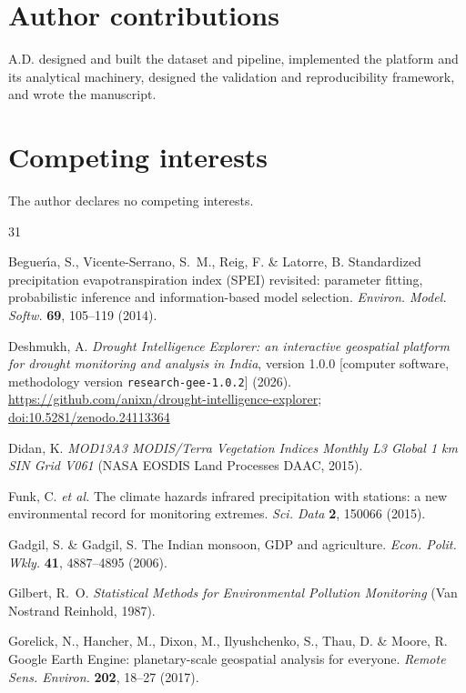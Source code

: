 \documentclass[10pt,a4paper]{article}
\begin{document}
\section*{Author contributions}
A.D. designed and built the dataset and pipeline, implemented the platform and its analytical machinery, designed the validation and reproducibility framework, and wrote the manuscript.

\section*{Competing interests}
The author declares no competing interests.

\begin{thebibliography}{31}
\footnotesize

 Beguer\'{\i}a, S., Vicente-Serrano, S.~M., Reig, F. \& Latorre, B. Standardized precipitation evapotranspiration index (SPEI) revisited: parameter fitting, probabilistic inference and information-based model selection. \textit{Environ. Model. Softw.} \textbf{69}, 105--119 (2014).

 Deshmukh, A. \textit{Drought Intelligence Explorer: an interactive geospatial platform for drought monitoring and analysis in India}, version 1.0.0 [computer software, methodology version \texttt{research-gee-1.0.2}] (2026). \url{https://github.com/anixn/drought-intelligence-explorer}; \href{https://doi.org/10.5281/zenodo.24113364}{doi:10.5281/zenodo.24113364}

 Didan, K. \textit{MOD13A3 MODIS/Terra Vegetation Indices Monthly L3 Global 1 km SIN Grid V061} (NASA EOSDIS Land Processes DAAC, 2015).

 Funk, C. \textit{et al.} The climate hazards infrared precipitation with stations: a new environmental record for monitoring extremes. \textit{Sci. Data} \textbf{2}, 150066 (2015).

 Gadgil, S. \& Gadgil, S. The Indian monsoon, GDP and agriculture. \textit{Econ. Polit. Wkly.} \textbf{41}, 4887--4895 (2006).

 Gilbert, R.~O. \textit{Statistical Methods for Environmental Pollution Monitoring} (Van Nostrand Reinhold, 1987).

 Gorelick, N., Hancher, M., Dixon, M., Ilyushchenko, S., Thau, D. \& Moore, R. Google Earth Engine: planetary-scale geospatial analysis for everyone. \textit{Remote Sens. Environ.} \textbf{202}, 18--27 (2017).


\end{thebibliography}
\end{document}
